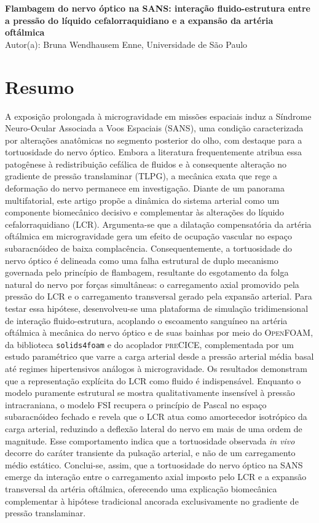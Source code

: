 \documentclass[article, hidelinks,oneside,12pt]{abntex2}
\begin{document}
\begin{center}
\textbf{Flambagem do nervo óptico na SANS: interação fluido-estrutura entre a pressão do líquido cefalorraquidiano e a expansão da artéria oftálmica}
\\
Autor(a): Bruna Wendhausem Enne, Universidade de São Paulo
\\
\end{center}

\section*{Resumo}

A exposição prolongada à microgravidade em missões espaciais induz a Síndrome Neuro-Ocular Associada a Voos Espaciais (SANS), uma condição caracterizada por alterações anatômicas no segmento posterior do olho, com destaque para a tortuosidade do nervo óptico. Embora a literatura frequentemente atribua essa patogênese à redistribuição cefálica de fluidos e à consequente alteração no gradiente de pressão translaminar (TLPG), a mecânica exata que rege a deformação do nervo permanece em investigação. Diante de um panorama multifatorial, este artigo propõe a dinâmica do sistema arterial como um componente biomecânico decisivo e complementar às alterações do líquido cefalorraquidiano (LCR). Argumenta-se que a dilatação compensatória da artéria oftálmica em microgravidade gera um efeito de ocupação vascular no espaço subaracnóideo de baixa complacência. Consequentemente, a tortuosidade do nervo óptico é delineada como uma falha estrutural de duplo mecanismo governada pelo princípio de flambagem, resultante do esgotamento da folga natural do nervo por forças simultâneas: o carregamento axial promovido pela pressão do LCR e o carregamento transversal gerado pela expansão arterial. Para testar essa hipótese, desenvolveu-se uma plataforma de simulação tridimensional de interação fluido-estrutura, acoplando o escoamento sanguíneo na artéria oftálmica à mecânica do nervo óptico e de suas bainhas por meio do \textsc{OpenFOAM}, da biblioteca \texttt{solids4foam} e do acoplador \textsc{preCICE}, complementada por um estudo paramétrico que varre a carga arterial desde a pressão arterial média basal até regimes hipertensivos análogos à microgravidade. Os resultados demonstram que a representação explícita do LCR como fluido é indispensável. Enquanto o modelo puramente estrutural se mostra qualitativamente insensível à pressão intracraniana, o modelo FSI recupera o princípio de Pascal no espaço subaracnóideo fechado e revela que o LCR atua como amortecedor isotrópico da carga arterial, reduzindo a deflexão lateral do nervo em mais de uma ordem de magnitude. Esse comportamento indica que a tortuosidade observada \textit{in vivo} decorre do caráter transiente da pulsação arterial, e não de um carregamento médio estático. Conclui-se, assim, que a tortuosidade do nervo óptico na SANS emerge da interação entre o carregamento axial imposto pelo LCR e a expansão transversal da artéria oftálmica, oferecendo uma explicação biomecânica complementar à hipótese tradicional ancorada exclusivamente no gradiente de pressão translaminar.
\end{document}
